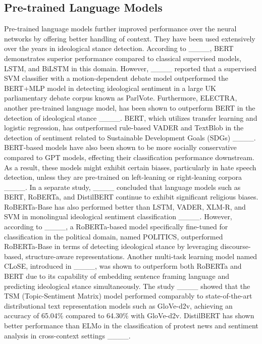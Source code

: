 \subsection*{\textbf{Pre-trained Language Models}}
Pre-trained language models further improved performance over the neural networks by offering better handling of context. They have been used extensively over the years in ideological stance detection. According to ____, BERT demonstrates superior performance compared to classical supervised models, LSTM, and BiLSTM in this domain. However, ____ reported that a supervised SVM classifier with a motion-dependent debate model outperformed the BERT+MLP model in detecting ideological sentiment in a large UK parliamentary debate corpus known as ParlVote. Furthermore, ELECTRA, another pre-trained language model, has been shown to outperform BERT in the detection of ideological stance ____. BERT, which utilizes transfer learning and logistic regression, has outperformed rule-based VADER and TextBlob in the detection of sentiment related to Sustainable Development Goals (SDGs) ____. BERT-based models have also been shown to be more socially conservative compared to GPT models, effecting their classification performance downstream. As a result, these models might exhibit certain biases, particularly in hate speech detection, unless they are pre-trained on left-leaning or right-leaning corpora ____. In a separate study, ____ concluded that language models such as BERT, RoBERTa, and DistilBERT continue to exhibit significant religious biases. RoBERTa-Base has also performed better than LSTM, VADER, XLM-R, and SVM in monolingual ideological sentiment classification ____. However, according to ____, a RoBERTa-based model specifically fine-tuned for classification in the political domain, named POLITICS, outperformed RoBERTa-Base in terms of detecting ideological stance by leveraging discourse-based, structure-aware representations. Another multi-task learning model named CLoSE, introduced in ____, was shown to outperform both RoBERTa and BERT due to its capability of embedding sentence framing language and predicting ideological stance simultaneously. The study ____ showed that the TSM (Topic-Sentiment Matrix) model performed comparably to state-of-the-art distributional text representation models such as GloVe-d2v, achieving an accuracy of 65.04\% compared to 64.30\% with GloVe-d2v. DistilBERT has shown better performance than ELMo in the classification of protest news and sentiment analysis in cross-context settings ____.

